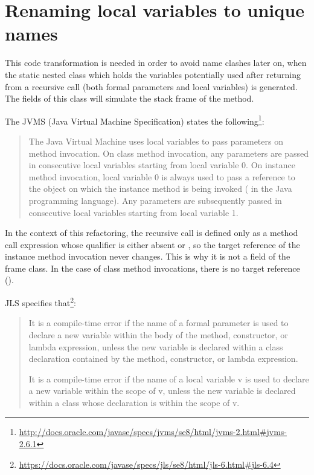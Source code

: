 \section{Renaming local variables to unique names}

This code transformation is needed in order to avoid name clashes later on, when the static nested class which
holds the variables potentially used after returning from a recursive call (both formal parameters and local variables)
is generated. The fields of this class will simulate the stack frame of the method.

The JVMS (Java Virtual Machine Specification) states the
following\footnote{\url{http://docs.oracle.com/javase/specs/jvms/se8/html/jvms-2.html#jvms-2.6.1}}:

\begin{quote}
    The Java Virtual Machine uses local variables to pass parameters on method invocation. On class method invocation,
    any parameters are passed in consecutive local variables starting from local variable 0. On instance method invocation,
    local variable 0 is always used to pass a reference to the object on which the instance method is being invoked
    ( in the Java programming language). Any parameters are subsequently passed in consecutive local
    variables starting from local variable 1.
\end{quote}

In the context of this refactoring, the recursive call is defined only as a method call expression whose qualifier is
either absent or , so the target reference of the instance method invocation never changes. This is why it is
not a field of the frame class. In the case of class method invocations, there is no target reference ().

JLS specifies that\footnote{\url{https://docs.oracle.com/javase/specs/jls/se8/html/jls-6.html#jls-6.4}}:
\begin{quote}
    It is a compile-time error if the name of a formal parameter is used to declare a new variable within the body of
    the method, constructor, or lambda expression, unless the new variable is declared within a class declaration
    contained by the method, constructor, or lambda expression.

    It is a compile-time error if the name of a local variable v is used to declare a new variable within the scope of
    v, unless the new variable is declared within a class whose declaration is within the scope of v.
\end{quote}

